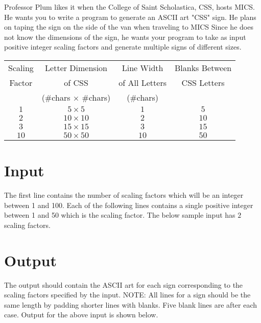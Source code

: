 
Professor Plum likes it when the College of Saint Scholastica, CSS, hosts MICS. He wants you to write a program to generate an ASCII art "CSS" sign. He plans on taping the sign on the side of the van when traveling to MICS  Since he does not know the dimensions of the sign, he wants your program to take as input positive integer scaling factors and generate multiple signs of different sizes.

\begin{center}
\begin{tabular}{|c|c|c|c|}
\hline
Scaling & Letter Dimension & Line Width & Blanks Between \\
Factor & of CSS & of All Letters & CSS Letters \\ 
 & (\#chars $\times$ \#chars) & (\#chars) &  \\ \hline
$1$ & $5 \times 5$ & $1$ & $5$ \\ \hline
$2$ & $10 \times 10$ & $2$ & $10$ \\ \hline
$3$ & $15 \times 15$ & $3$ & $15$ \\ \hline
$10$ & $50 \times 50$ & $10$ & $50$ \\ \hline
\end{tabular}
\end{center}

\section*{Input}
The first line contains the number of scaling factors which will be an integer between 1 and 100. Each of the following lines contains a single positive integer between 1 and 50 which is the scaling factor. The below sample input has $2$ scaling factors.

\section*{Output}
The output should contain the ASCII art for each sign corresponding to the scaling factors specified by the input.  NOTE: All lines for a sign should be the same length by padding shorter lines with blanks. Five blank lines are after each case. Output for the above input is shown below.